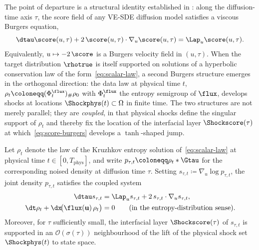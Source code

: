 The point of departure is a structural identity established in \citet{sarkar2026scoreshocks}: along the diffusion-time axis $\tau$, the score field of any VE-SDE diffusion model satisfies a viscous Burgers equation,
\begin{equation}
  \label{eq:score-burgers}
  \dtau \score(u, \tau) + 2\,\score(u, \tau) \cdot \nabla_u \score(u, \tau) = \Lap_u \score(u, \tau).
\end{equation}
Equivalently, $u \mapsto -2\,\score$ is a Burgers velocity field in $(u, \tau)$. When the target distribution $\rhotrue$ is itself supported on solutions of a hyperbolic conservation law of the form~\eqref{eq:scalar-law}, a second Burgers structure emerges in the orthogonal direction: the data law at physical time $t$, $\rho_{t} \coloneqq (\Phi^{\flux}_{t})_{\#} \rho_{0}$ with $\Phi^{\flux}_{t}$ the entropy semigroup of $\flux$, develops shocks at locations $\Shockphys(t) \subset \Omega$ in finite time. The two structures are not merely parallel; they are \emph{coupled}, in that physical shocks define the singular support of $\rho_{t}$ and thereby fix the location of the interfacial layer $\Shockscore(\tau)$ at which~\eqref{eq:score-burgers} develops a $\tanh$-shaped jump.

\begin{theorem}
\label{thm:double-burgers}
Let $\rho_{t}$ denote the law of the Kruzhkov entropy solution of~\eqref{eq:scalar-law} at physical time $t \in [0, T_{\mathrm{phys}}]$, and write $p_{\tau, t} \coloneqq \rho_{t} \ast \Gtau$ for the corresponding noised density at diffusion time $\tau$. Setting $s_{\tau, t} \coloneqq \nabla_u \log p_{\tau, t}$, the joint density $p_{\tau, t}$ satisfies the coupled system
\begin{align}
  \label{eq:dburg-system}
  \dtau s_{\tau, t} &= \Lap_u s_{\tau, t} + 2\,s_{\tau, t} \cdot \nabla_u s_{\tau, t}, \\
  \dt \rho_{t} + \dx\!\bigl(\flux(\mathbf{u})\,\rho_{t}\bigr) &= 0 \qquad \text{(in the entropy-distribution sense)}. \notag
\end{align}
Moreover, for $\tau$ sufficiently small, the interfacial layer $\Shockscore(\tau)$ of $s_{\tau, t}$ is supported in an $\mathcal{O}(\sigma(\tau))$ neighbourhood of the lift of the physical shock set $\Shockphys(t)$ to state space.
\end{theorem}


